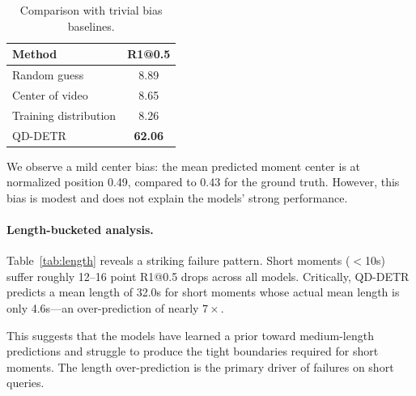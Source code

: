 \documentclass[10pt,twocolumn]{article}
\begin{document}
\begin{table}[t]
\centering
\caption{Comparison with trivial bias baselines.}
\label{tab:bias}
\small
\begin{tabular}{@{}lc@{}}
\toprule
\textbf{Method} & \textbf{R1@0.5} \\
\midrule
Random guess & 8.89 \\
Center of video & 8.65 \\
Training distribution & 8.26 \\
\midrule
QD-DETR & \textbf{62.06} \\
\bottomrule
\end{tabular}
\vspace{-6pt}
\end{table}

We observe a mild center bias: the mean predicted moment center is at normalized position 0.49, compared to 0.43 for the ground truth. However, this bias is modest and does not explain the models' strong performance.

\paragraph{Length-bucketed analysis.}
Table~\ref{tab:length} reveals a striking failure pattern. Short moments ($<$10s) suffer roughly 12--16 point R1@0.5 drops across all models. Critically, QD-DETR predicts a mean length of 32.0s for short moments whose actual mean length is only 4.6s---an over-prediction of nearly $7\times$.

\begin{table}[t]
\centering
\caption{Performance by ground-truth moment length for QD-DETR. Short moments are the dominant failure mode.}
\label{tab:length}
\small
{}
\vspace{-6pt}
\end{table}

This suggests that the models have learned a prior toward medium-length predictions and struggle to produce the tight boundaries required for short moments. The length over-prediction is the primary driver of failures on short queries.
\end{document}
